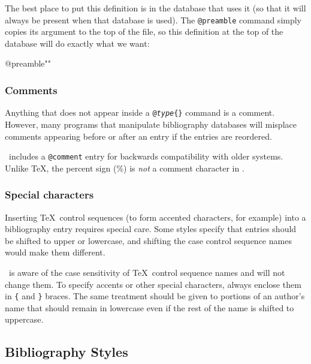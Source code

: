 The best place to put this definition is in the database that uses it
(so that it will always be present when that database is used).  The
\texttt{@preamble} command simply copies its argument to the top of the
 file, so this definition at the top of the database will
do exactly what we want:

\begin{shortexample}
@preamble{"\def\noopsort#1{}"}
\end{shortexample}

\newpage
\subsubsection{Comments}

Anything that 
does not appear inside a \verb|@|\texttt{\textit{type}}\verb|{}|
command is a comment. However, many programs that manipulate
bibliography databases will misplace comments appearing before or
after an entry if the entries are reordered.

\BibTeX\ includes a \verb|@comment| entry for backwards compatibility
with older systems.
Unlike \TeX, the percent sign (\%) is {\em not} a
comment character in \BibTeX.

\subsubsection{Special characters}

Inserting \TeX\ control sequences (to 
form accented characters, for example)
into a bibliography entry requires special care.  Some styles specify
that entries should be shifted to upper or lowercase, and shifting
the case control sequence names would make them different.

\BibTeX\ is aware of the case sensitivity of \TeX\ control sequence names
and will not change them.  To specify accents or other special characters,
always enclose them in \verb|{| and \verb|}| braces.  The same
treatment should be given to portions of an author's name that should
remain in lowercase even if the rest of the name is shifted to uppercase.

\subsection{Bibliography Styles}

